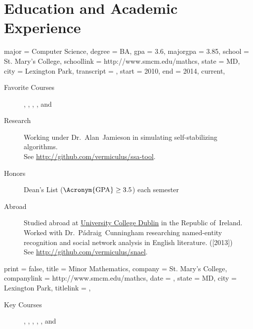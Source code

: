 \documentclass{simplecv}
\begin{document}
\section{Education and Academic Experience}
\begin{education}
  {
    major = Computer Science,
    degree = BA,
    gpa = 3.6,
    majorgpa = 3.85,
    school = St. Mary's College,
    schoollink = http://www.smcm.edu/mathcs,
    state = MD,
    city = Lexington Park,
    transcript = \transcript,
    start = 2010,
    end = 2014,
    current,
  }

\begin{description}
\item[Favorite Courses]
  ,
  ,
  ,
  ,
  and
\item[Research] Working under Dr.~Alan~Jamieson in simulating
  self-stabilizing algorithms.
  \\
  See \url{http://github.com/vermiculus/ssa-tool}.
\item[Honors] Dean's List ($\text{\Acronym{GPA}} \geq 3.5$) each semester
\item[Abroad] Studied abroad at \href{http://www.ucd.ie}{University College Dublin} in the Republic of~Ireland.
  Worked with Dr.~P\'adraig~Cunningham researching named-entity recognition and social network
  analysis in English literature. ([2013])
  \\
  See \url{http://github.com/vermiculus/snael}.
\end{description}
\end{education}

\begin{position}
  {
    print   = false,
    title   = Minor \Dash Mathematics,
    company = St. Mary's College,
    companylink = http://www.smcm.edu/mathcs,
    date    = ,
    state   = MD,
    city    = Lexington Park,
    titlelink = \transcript,
  }

  \begin{description}
  \item[Key Courses]
    ,
    ,
    ,
    ,
    ,
    and
  \end{description}
\end{position}
\end{document}
